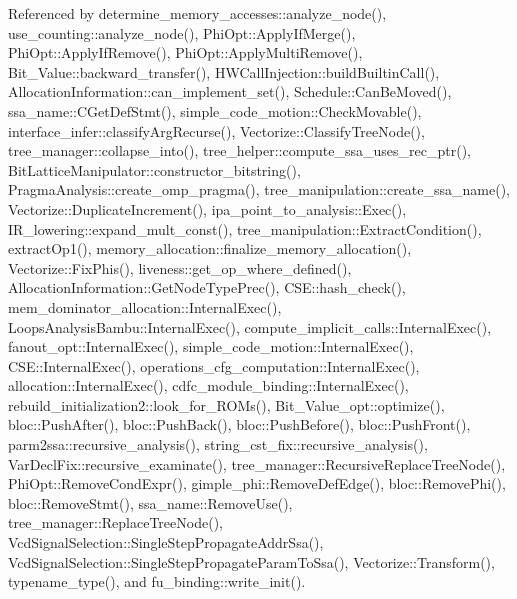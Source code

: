 Referenced by determine\+\_\+memory\+\_\+accesses\+::analyze\+\_\+node(), use\+\_\+counting\+::analyze\+\_\+node(), Phi\+Opt\+::\+Apply\+If\+Merge(), Phi\+Opt\+::\+Apply\+If\+Remove(), Phi\+Opt\+::\+Apply\+Multi\+Remove(), Bit\+\_\+\+Value\+::backward\+\_\+transfer(), H\+W\+Call\+Injection\+::build\+Builtin\+Call(), Allocation\+Information\+::can\+\_\+implement\+\_\+set(), Schedule\+::\+Can\+Be\+Moved(), ssa\+\_\+name\+::\+C\+Get\+Def\+Stmt(), simple\+\_\+code\+\_\+motion\+::\+Check\+Movable(), interface\+\_\+infer\+::classify\+Arg\+Recurse(), Vectorize\+::\+Classify\+Tree\+Node(), tree\+\_\+manager\+::collapse\+\_\+into(), tree\+\_\+helper\+::compute\+\_\+ssa\+\_\+uses\+\_\+rec\+\_\+ptr(), Bit\+Lattice\+Manipulator\+::constructor\+\_\+bitstring(), Pragma\+Analysis\+::create\+\_\+omp\+\_\+pragma(), tree\+\_\+manipulation\+::create\+\_\+ssa\+\_\+name(), Vectorize\+::\+Duplicate\+Increment(), ipa\+\_\+point\+\_\+to\+\_\+analysis\+::\+Exec(), I\+R\+\_\+lowering\+::expand\+\_\+mult\+\_\+const(), tree\+\_\+manipulation\+::\+Extract\+Condition(), extract\+Op1(), memory\+\_\+allocation\+::finalize\+\_\+memory\+\_\+allocation(), Vectorize\+::\+Fix\+Phis(), liveness\+::get\+\_\+op\+\_\+where\+\_\+defined(), Allocation\+Information\+::\+Get\+Node\+Type\+Prec(), C\+S\+E\+::hash\+\_\+check(), mem\+\_\+dominator\+\_\+allocation\+::\+Internal\+Exec(), Loops\+Analysis\+Bambu\+::\+Internal\+Exec(), compute\+\_\+implicit\+\_\+calls\+::\+Internal\+Exec(), fanout\+\_\+opt\+::\+Internal\+Exec(), simple\+\_\+code\+\_\+motion\+::\+Internal\+Exec(), C\+S\+E\+::\+Internal\+Exec(), operations\+\_\+cfg\+\_\+computation\+::\+Internal\+Exec(), allocation\+::\+Internal\+Exec(), cdfc\+\_\+module\+\_\+binding\+::\+Internal\+Exec(), rebuild\+\_\+initialization2\+::look\+\_\+for\+\_\+\+R\+O\+Ms(), Bit\+\_\+\+Value\+\_\+opt\+::optimize(), bloc\+::\+Push\+After(), bloc\+::\+Push\+Back(), bloc\+::\+Push\+Before(), bloc\+::\+Push\+Front(), parm2ssa\+::recursive\+\_\+analysis(), string\+\_\+cst\+\_\+fix\+::recursive\+\_\+analysis(), Var\+Decl\+Fix\+::recursive\+\_\+examinate(), tree\+\_\+manager\+::\+Recursive\+Replace\+Tree\+Node(), Phi\+Opt\+::\+Remove\+Cond\+Expr(), gimple\+\_\+phi\+::\+Remove\+Def\+Edge(), bloc\+::\+Remove\+Phi(), bloc\+::\+Remove\+Stmt(), ssa\+\_\+name\+::\+Remove\+Use(), tree\+\_\+manager\+::\+Replace\+Tree\+Node(), Vcd\+Signal\+Selection\+::\+Single\+Step\+Propagate\+Addr\+Ssa(), Vcd\+Signal\+Selection\+::\+Single\+Step\+Propagate\+Param\+To\+Ssa(), Vectorize\+::\+Transform(), typename\+\_\+type(), and fu\+\_\+binding\+::write\+\_\+init().

